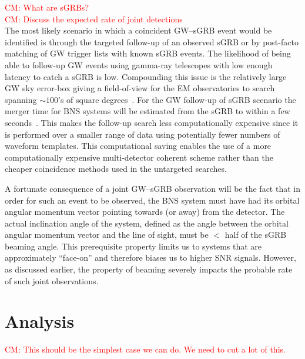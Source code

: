 \documentclass[10pt]{iopart}
\newcommand{\cm}[1]{\textcolor{red}{CM: #1}}
\begin{document}
\cm{What are sGRBs?}\\

\cm{Discuss the expected rate of joint detections}\\

The most likely scenario in which a coincident \ac{GW}--\ac{sGRB} event would
be identified is through the targeted follow-up of an observed \ac{sGRB} or by
post-facto matching of \ac{GW} trigger lists with known \ac{sGRB} events.  The
likelihood of being able to follow-up \ac{GW} events using gamma-ray telescopes
with low enough latency to catch a \ac{sGRB} is low.  Compounding this issue is
the relatively large \ac{GW} sky error-box giving a field-of-view for the
\ac{EM} observatories to search spanning $\sim 100$'s of square
degrees~\cite{grb}.  For the \ac{GW} follow-up of \ac{sGRB} scenario the merger
time for \ac{BNS} systems will be estimated from the \ac{sGRB} to within a few
seconds~\cite{grb}.  This makes the follow-up search less computationally
expensive since it is performed over a smaller range of data using potentially
fewer numbers of waveform templates.  This computational saving enables the use
of a more computationally expensive multi-detector coherent scheme rather than
the cheaper coincidence methods used in the untargeted searches. 

A fortunate consequence of a joint \ac{GW}--\ac{sGRB} observation will be the
fact that in order for such an event to be observed, the \ac{BNS} system must
have had its orbital angular momentum vector pointing towards (or away) from
the detector.  The actual inclination angle of the system, defined as the angle
between the orbital angular momentum vector and the line of sight, must be $<$
half of the \ac{sGRB} beaming angle.  This prerequisite property limits us to
systems that are approximately ``face-on'' and therefore biases us to higher
\ac{SNR} signals.  However, as discussed earlier, the property of beaming
severely impacts the probable rate of such joint observations.   


\section{Analysis}

\cm{This should be the simplest case we can do.  We need to cut a lot of this.}
\end{document}
